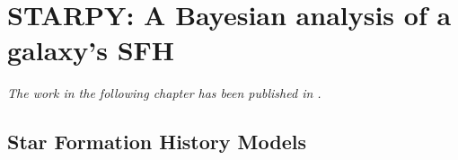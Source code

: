\chapter{STARPY: A Bayesian analysis of a galaxy's SFH}

\emph{The work in the following chapter has been published in \citet{smethurst15}.}
\\

\section{Star Formation History Models}\label{qmod}

 \begin{figure}

\end{figure}
